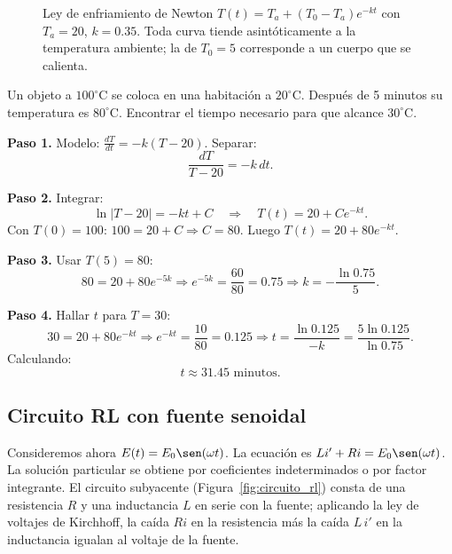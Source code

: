 \begin{figure}[!htbp]
\centering
{}
\caption{Ley de enfriamiento de Newton \(T(t)=T_a+(T_0-T_a)e^{-kt}\) con \(T_a=20\), \(k=0.35\). Toda curva tiende asintóticamente a la temperatura ambiente; la de \(T_0=5\) corresponde a un cuerpo que se calienta.}
\label{fig:enfriamiento_curvas}
\end{figure}

\begin{example}
Un objeto a \(100^\circ\)C se coloca en una habitación a \(20^\circ\)C. Después de 5 minutos su temperatura es \(80^\circ\)C. Encontrar el tiempo necesario para que alcance \(30^\circ\)C.

\begin{myproof}
\textbf{Paso 1.} Modelo: \(\frac{dT}{dt} = -k(T-20)\). Separar:
\[
\frac{dT}{T-20} = -k\,dt.
\]

\textbf{Paso 2.} Integrar:
\[
\ln|T-20| = -kt + C \quad\Rightarrow\quad T(t) = 20 + Ce^{-kt}.
\]
Con \(T(0)=100\): \(100 = 20 + C \Rightarrow C=80\). Luego \(T(t)=20+80e^{-kt}\).

\textbf{Paso 3.} Usar \(T(5)=80\):
\[
80 = 20 + 80e^{-5k} \Rightarrow e^{-5k} = \frac{60}{80} = 0.75 \Rightarrow k = -\frac{\ln 0.75}{5}.
\]

\textbf{Paso 4.} Hallar \(t\) para \(T=30\):
\[
30 = 20 + 80e^{-kt} \Rightarrow e^{-kt} = \frac{10}{80} = 0.125 \Rightarrow t = \frac{\ln 0.125}{-k} = \frac{5\ln 0.125}{\ln 0.75}.
\]
Calculando:
\[
\boxed{t \approx 31.45 \text{ minutos}}.
\]
\end{myproof}
\end{example}

\subsection{Circuito RL con fuente senoidal}
Consideremos ahora \(E(t)=E_0 \sen(\omega t)\). La ecuación es \(L i' + R i = E_0 \sen(\omega t)\). La solución particular se obtiene por coeficientes indeterminados o por factor integrante. El circuito subyacente (Figura~\ref{fig:circuito_rl}) consta de una resistencia \(R\) y una inductancia \(L\) en serie con la fuente; aplicando la ley de voltajes de Kirchhoff, la caída \(Ri\) en la resistencia más la caída \(L\,i'\) en la inductancia igualan al voltaje de la fuente.

